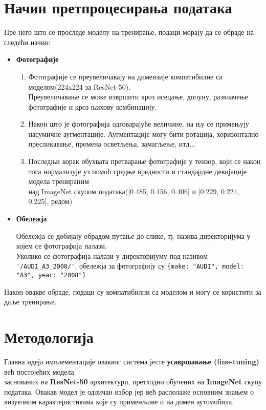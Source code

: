\documentclass{article}
\begin{document}
  \section{Начин претпроцесирања података}
  Пре него што се проследе моделу на тренирање, подаци морају да се обраде на следећи начин:
  \begin{itemize}
    \item \textbf{Фотографије}
      \begin{enumerate}
        \item Фотографије се преувеличавају на димензије компатибилне са моделом(224x224 за ResNet-50).\\ 
          Преувеличавање се може извршити кроз исецање, допуну, развлачење фотографије и кроз њихову комбинацију.
        \item Након што је фотографија одговарајуће величине, на њу се примењују насумичне аугментације. Аугментације могу бити ротација, хоризонтално пресликавање, промена осветљења, замагљење, итд...
        \item Последњи корак обухвата претварање фотографије у тензор, који се након тога нормализује уз помоћ средње вредности и стандардне девијације модела тренираним \\ 
          над ImageNet скупом података([0.485, 0.456, 0.406] и [0.229, 0.224, 0.225], редом)
      \end{enumerate}
    \item \textbf{Обележја}

      Обележја се добијају обрадом путање до слике, тј. назива директоријума у којем се фотографија налази. \\ 
      Уколико се фотографија налази у директоријуму под називом \verb|'/AUDI_A3_2008/'|, обележја за фотографију су \verb|{make: "AUDI", model: "A3", year: "2008"}|
  \end{itemize}
  Након овакве обраде, подаци су компатибилни са моделом и могу се користити за даље тренирање.
  \section{Методологија}
 Главна идеја имплементације оваквог система јесте \textbf{усавршавање (fine-tuning)} већ постојећих модела \\ 
 заснованих на \textbf{ResNet-50} архитектури, претходно обучених на \textbf{ImageNet} скупу података. Овакав модел је одличан избор јер већ располаже основним знањем о визуелним карактеристикама које су применљиве и на домен аутомобила. 
\end{document}
